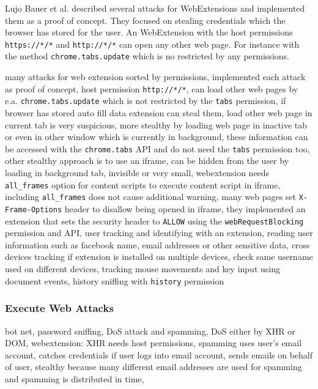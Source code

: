 			Lujo Bauer et al. described several attacks for WebExtensions and implemented them as a proof of concept. They focused on stealing credentials which the browser has stored for the user. An WebExtension with the host permissions \texttt{https://*/*} and \texttt{http://*/*} can open any other web page. For instance with the method \texttt{chrome.tabs.update} which is no restricted by any permissions. 
			
			\cite{extensions:cns14} many attacks for web extension sorted by permissions, implemented each attack as proof of concept, host permission \texttt{http://*/*}, can load other web pages by e.a. \texttt{chrome.tabs.update} which is not restricted by the \texttt{tabs} permission, if browser has stored auto fill data extension can steal them, load other web page in current tab is very suspicious, more stealthy by loading web page in inactive tab or even in other window which is currently in background, these information can be accessed with the \texttt{chrome.tabs} API and do not need the \texttt{tabs} permission too, other stealthy approach is to use an iframe, can be hidden from the user by loading in background tab, invisible or very small, webextension needs \texttt{all\_frames} option for content scripts to execute content script in iframe, including \texttt{all\_frames} does not cause additional warning, many web pages set \texttt{X-Frame-Options} header to disallow being opened in iframe, they implemented an extension that sets the security header to \texttt{ALLOW} using the \texttt{webRequestBlocking} permission and API, user tracking and identifying with an extension, reading user information such as facebook name, email addresses or other sensitive data, cross devices tracking if extension is installed on multiple devices, check same username used on different devices, tracking mouse movements and key input using document events, history sniffing with \texttt{history} permission \\
	 
	 	\subsubsection{Execute Web Attacks}
	 	
	 		\cite{liu2011botnet, Liu12chromeextensions:} bot net, password sniffing, DoS attack and spamming, DoS either by XHR or DOM, webextension: XHR needs host permissions, spamming uses user's email account, catches credentials if user logs into email account, sends emails on behalf of user, stealthy because many different email addresses are used for spamming and spamming is distributed in time, \\
	 	
